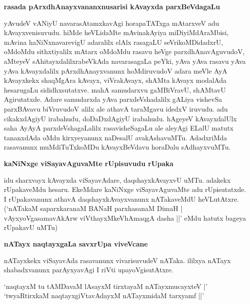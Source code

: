 {\medskip
\noindent
{\large\bf rasada pArxdhAnayxvananxnusarisi kAvayxda parxBeVdagaLu}}\label{page240}
\smallskip

\noindent
yAvudeV vANiyU navarasAtamxkavAgi horapaTATxga mAtarxveV adu kAvayx\-venisuvudu. hiMde heVLi\-daMte mAvinakAyiya miDiyiMdAraMbisi, mAvina haNiNxnavarevigU adaralilx elAlx rasagaLU seVrikoMDidadxrU, oMdoMdu sithxtiyalilx mAtarx oMdoMdu rasavu heVge parxdhAnavAguvudoV, aMte\-yeV sAhitayxdalilxrabeVkAda navarasagaLa peYki, yAva yAva rasavu yAva yAva kAvayxdalilx pArxdhAnayx\-vanunx hoMdiruvudoV adara meVle AyA kAvayxkekx shaqMgAra kAvayx, viVrakAvayx, shAMta kAvayx moda\-lAda hesarugaLu sididhxsutatxve. mahA samudarxvu gaMBiVravU, shAMtavU Agirutatxde. Adare samudarxda yAva parxdeVshadalilx gALiya vishevSa parxBAvavu biVruvudoV alilx ale athavA taraMgavu idedxV iru\-vudu. adu cikakxdAgiyU irabahudu, doDaDxdAgiyU irabahudu. hAgeyeV kAvayxdalUlx saha AyAyA parxdeVshagaLalilx rasavisheSagaLu ale aleyAgi ELalU matutx tananxdAda oMdu kirxye\-yanunx naDesalU avakAshavuMTu. AdadxriMda rasavanunx muMdiTuTxkoMDu kAvayxBeVdavu horaDalu sAdhayx\-vuMTu.

{\medskip
\noindent
{\large\bf kaNiNxge viSayavAguvaMte rUpisuvudu rUpaka}}\label{page241}
\smallskip

\noindent
idu sharxvayx kAvayxda viSayavAdare, daqshayxkAvayxvU uMTu. adakekx rUpakaveMdu hesaru. EkeMdare kaNiNxge viSayavAguvaMte adu rUpisutatxde. I rUpakavanunx athavA daqshayxkAvayxvanunx nATakaveMdU heVLutAtxre. (`nATakaM saparxkaranaM\label{241} BANaH parxhasanaM DimaH | vAyxyoVgasamavAkArw viVthayxMkeVhAmaqgA dasha ||' eMdu hatutx bageya rUpakavU uMTu)

{\medskip
\noindent
{\large\bf nATayx naqtayxgaLa savxrUpa viveVcane}}\label{page241}
\smallskip

\noindent
nATayxkekx viSayavAda rasavanunx vivarisuvudeV nATaka. ililxya nATayx shabadxvanunx parAyxyavAgi I riVti upayoVgisutAtxre.

\begin{shloka}
`naqtayxM tu tAMDavaM lAsayxM tirxtayaM nATayxmucayxteV |'\\\label{241}
`twyaRtirxkaM naqtayxgiVtavAdayxM nATayxmidaM tarxyamf ||\label{241}'
\end{shloka}


